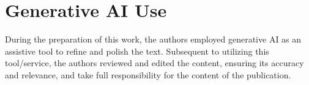 \documentclass[final,3p,times]{elsarticle}
\begin{document}


\section{Generative AI Use}

During the preparation of this work, the authors employed generative AI as an assistive tool to refine and polish the text. Subsequent to utilizing this tool/service, the authors reviewed and edited the content, ensuring its accuracy and relevance, and take full responsibility for the content of the publication.


\appendix



  
 





\end{document}
